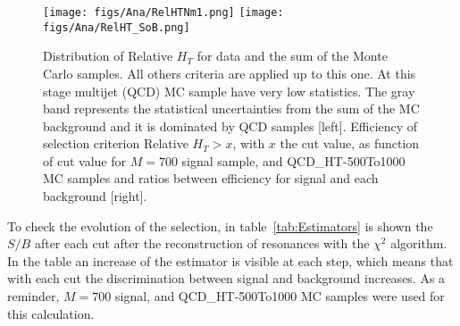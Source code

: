 \begin{figure}[!Hhtbp]
  \begin{center}
    \texttt{[image: figs/Ana/RelHTNm1.png]}
    \texttt{[image: figs/Ana/RelHT\_SoB.png]}
    \caption{Distribution of Relative $H_{T}$ for data and the sum of the Monte Carlo samples. All others criteria are applied up to this one. At this stage multijet (QCD) MC sample have very low statistics. The gray band represents the statistical uncertainties from the sum of the MC background and it is dominated by QCD samples [left]. Efficiency of selection criterion Relative $H_{T}>x$, with $x$ the cut value, as function of cut value for $M=700$ \GeVcc signal sample, \ttbar and QCD\_HT-500To1000 MC samples and ratios between efficiency for signal and each background [right]. }
    \label{fig:RelHtMass}
  \end{center}
\end{figure}

To check the evolution of the selection, in table~\ref{tab:Estimators} is shown the $S/B$ after each cut after the reconstruction of resonances with the $\chi^{2}$ algorithm. In the table an increase of the estimator is visible at each step, which means that with each cut the discrimination between signal and background increases. As a reminder, $M=700$ \GeVcc signal, \ttbar and QCD\_HT-500To1000 MC samples were used for this calculation. %

